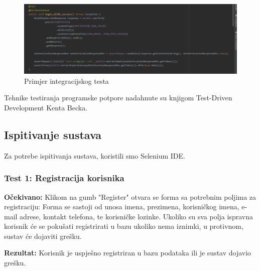 			\begin{figure}[H]
				\begin{center}
					\includegraphics[width=17cm]{slike/integracijski_test.PNG}
				\end{center}
				\caption{Primjer integracijskog testa}
				\label{fig:inttest}
			\end{figure}
			
			Tehnike testiranja programske potpore nadahnute su knjigom Test-Driven Development Kenta Becka.
			
			
			
			\subsection{Ispitivanje sustava}
			
			 
		 	Za potrebe ispitivanja sustava, koristili smo Selenium IDE.
		 	
		 	\subsubsection{Test 1: Registracija korisnika}
		 		
		 		\textbf{Očekivano:} Klikom na gumb "Register" otvara se forma sa potrebnim poljima za registraciju: Forma se sastoji od unosa imena, prezimena, korisničkog imena, e-mail adrese, kontakt telefona, te korisničke lozinke. Ukoliko su sva polja ispravna korisnik će se pokušati registrirati u bazu ukoliko nema iznimki, u protivnom, sustav će dojaviti grešku.
		 		
		 		
		 		\noindent\textbf{Rezultat:} Korisnik je uspješno registriran u bazu podataka ili je sustav dojavio grešku.
		 		
